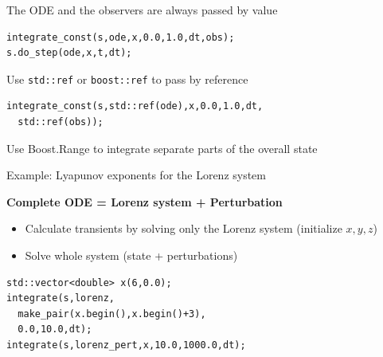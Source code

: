\begin{frame}

\end{frame}


\begin{frame}[fragile]

\vspace{2ex}

 The ODE and the observers are always passed by value

 \begin{lstlisting}
integrate_const(s,ode,x,0.0,1.0,dt,obs);
s.do_step(ode,x,t,dt);
 \end{lstlisting}


\vspace{2ex}
Use {\tt std::ref} or {\tt boost::ref} to pass by reference
 \begin{lstlisting}
integrate_const(s,std::ref(ode),x,0.0,1.0,dt,
  std::ref(obs));
 \end{lstlisting}

\end{frame}



\begin{frame}[fragile]

 \vspace{2ex}
 Use Boost.Range to integrate separate parts of the overall state

 \vspace{2ex}
 Example: Lyapunov exponents for the Lorenz system

 \vspace{2ex}

 \centerline{\bf Complete ODE = Lorenz system + Perturbation}


 \begin{itemize}
  \item Calculate transients by solving only the Lorenz system (initialize $x,y,z$)
  \item Solve whole system (state + perturbations)
 \end{itemize}

\vspace{2ex}

 \begin{lstlisting}
std::vector<double> x(6,0.0);
integrate(s,lorenz,
  make_pair(x.begin(),x.begin()+3),
  0.0,10.0,dt);
integrate(s,lorenz_pert,x,10.0,1000.0,dt);
 \end{lstlisting}



\end{frame}



